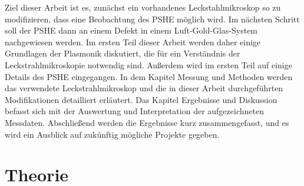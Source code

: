 \documentclass[titlepage]{article}
\begin{document}
Ziel dieser Arbeit ist es, zunächst ein vorhandenes Leckstahlmikroskop so zu modifizieren, dass eine Beobachtung des PSHE möglich wird. Im nächsten Schritt soll der PSHE dann an einem Defekt in einem Luft-Gold-Glas-System nachgewiesen werden. Im ersten Teil dieser Arbeit werden daher einige Grundlagen der Plasmonik diskutiert, die für ein Verständnis der Leckstrahlmikroskopie notwendig sind. Außerdem wird im ersten Teil auf einige Details des PSHE eingegangen. In dem Kapitel Messung und Methoden werden das verwendete Leckstrahlmikroskop und die in dieser Arbeit durchgeführten Modifikationen detailliert erläutert. Das Kapitel Ergebnisse und Diskussion befasst sich mit der Auswertung und Interpretation der aufgezeichneten Messdaten. Abschließend werden die Ergebnisse kurz zusammengefasst, und es wird ein Ausblick auf zukünftig mögliche Projekte gegeben.  

\section{Theorie}
\end{document}
